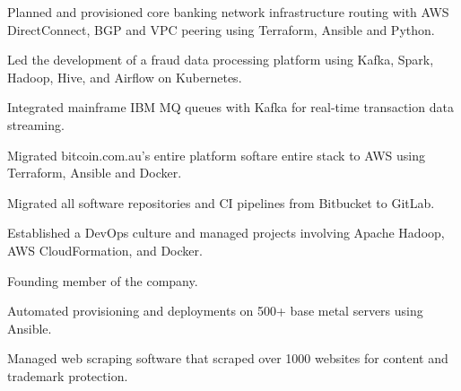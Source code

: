 \documentclass[]{resume}
\begin{document}
\begin{minipage}[t]{0.60\textwidth}
\begin{tightemize}
\item Planned and provisioned core banking network infrastructure routing with AWS DirectConnect, BGP and VPC peering using Terraform, Ansible and Python.
\end{tightemize}
\sectionsep

\begin{tightemize}
\item Led the development of a fraud data processing platform using Kafka, Spark, Hadoop, Hive, and Airflow on Kubernetes.
\item Integrated mainframe IBM MQ queues with Kafka for real-time transaction data streaming.
\end{tightemize}
\sectionsep

\begin{tightemize}
\item Migrated bitcoin.com.au's entire platform softare entire stack to AWS using Terraform, Ansible and Docker.
\item Migrated all software repositories and CI pipelines from Bitbucket to GitLab.
\end{tightemize}
\sectionsep

\begin{tightemize}
\item Established a DevOps culture and managed projects involving Apache Hadoop, AWS CloudFormation, and Docker.
\end{tightemize}
\sectionsep

\begin{tightemize}
\item Founding member of the company.
\item Automated provisioning and deployments on 500+ base metal servers using Ansible.
\item Managed web scraping software that scraped over 1000 websites for content and trademark protection.
\end{tightemize}
\sectionsep

%
%

\end{minipage}
\end{document}
